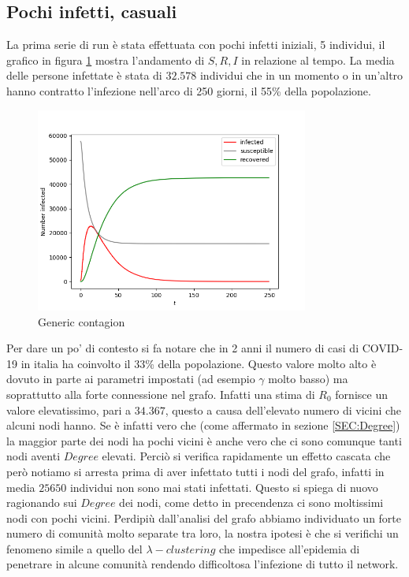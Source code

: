 \documentclass[a4paper]{article}
\begin{document}
\subsection{Pochi infetti, casuali}
La prima serie di run è stata effettuata con pochi infetti iniziali, 5 individui, il grafico in figura \ref{FIG:generic} mostra l'andamento di $S, R, I$ in relazione al tempo.
La media delle persone infettate è stata di $32.578$ individui che in un momento o in un'altro hanno contratto l'infezione nell'arco di 250 giorni, il 55\% della popolazione.\\
\begin{figure}[!ht]
\centering
\includegraphics[width=0.8\textwidth]{generic_run.png}
\caption{Generic contagion} \label{FIG:generic}
\end{figure}

Per dare un po' di contesto si fa notare che in 2 anni il numero di casi di COVID-19 in italia ha coinvolto il 33\% della popolazione.
Questo valore molto alto è dovuto in parte ai parametri impostati (ad esempio $\gamma$ molto basso) ma soprattutto alla forte connessione nel grafo.
Infatti una stima di $R_0$ fornisce un valore elevatissimo, pari a $34.367$, questo a causa dell'elevato numero di vicini che alcuni nodi hanno.
Se è infatti vero che (come affermato in sezione \ref{SEC:Degree}) la maggior parte dei nodi ha pochi vicini è anche vero che ci sono comunque tanti nodi aventi $Degree$ elevati.
Perciò si verifica rapidamente un effetto cascata che però notiamo si arresta prima di aver infettato tutti i nodi del grafo, infatti in media $25650$ individui non sono mai stati infettati.
Questo si spiega di nuovo ragionando sui $Degree$ dei nodi, come detto in precendenza ci sono moltissimi nodi con pochi vicini.
Perdipiù dall'analisi del grafo abbiamo individuato un forte numero di comunità molto separate tra loro, la nostra ipotesi è che si verifichi un fenomeno simile a quello del $\lambda - clustering$ che impedisce all'epidemia di penetrare in alcune comunità rendendo difficoltosa l'infezione di tutto il network.
\end{document}
